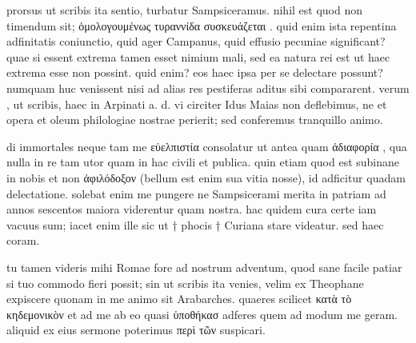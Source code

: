 


 prorsus ut scribis ita sentio, turbatur Sampsiceramus. nihil est quod non timendum sit; ὁμολογουμένως τυραννίδα συσκευάζεται . quid enim ista repentina adfinitatis coniunctio, quid ager Campanus, quid effusio pecuniae significant? quae si essent extrema tamen esset nimium mali, sed ea natura rei est ut haec extrema esse non possint. quid enim? eos haec ipsa per se delectare possunt? numquam huc venissent nisi ad alias res pestiferas aditus sibi compararent. verum , ut scribis, haec in Arpinati a. d. vi circiter Idus Maias non deflebimus, ne et opera et oleum philologiae nostrae perierit; sed conferemus tranquillo animo.

 di immortales neque tam me εὐελπιστία consolatur ut antea quam ἀδιαφορία , qua nulla in re tam utor quam in hac civili et publica. quin etiam quod est subinane in nobis et non ἀφιλόδοξον (bellum est enim sua vitia nosse), id adficitur quadam delectatione. solebat enim me pungere ne Sampsicerami merita in patriam ad annos sescentos maiora viderentur quam nostra. hac quidem cura certe iam vacuus sum; iacet enim ille sic ut † phocis † Curiana stare videatur. sed haec coram.

 tu tamen videris mihi Romae fore ad nostrum adventum, quod sane facile patiar si tuo commodo fieri possit; sin ut scribis ita venies, velim ex Theophane expiscere quonam in me animo sit Arabarches. quaeres scilicet κατὰ τὸ κηδεμονικὸν et ad me ab eo quasi ὑποθήκασ adferes quem ad modum me geram. aliquid ex eius sermone poterimus περὶ τῶν suspicari.
